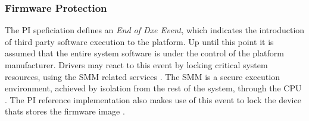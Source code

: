 \subsubsection{Firmware Protection}

The \ac{PI} speficiation defines an \emph{End of Dxe Event}, which indicates the introduction of third party software execution to the platform.
Up until this point it is assumed that the entire system software is under the control of the platform manufacturer.
Drivers may react to this event by locking critical system resources, using the \ac{SMM} related services \cite[Vol. 2, 5.1.2.1]{pi-spec}.
The \ac{SMM} is a secure execution environment, achieved by isolation from the rest of the system, through the \ac{CPU} \cite[Vol. 4, Section 1.3]{pi-spec}.
The \ac{PI} reference implementation also makes use of this event to lock the device thats stores the firmware image \cite{tianocore-edk2-fmpdxe}.
